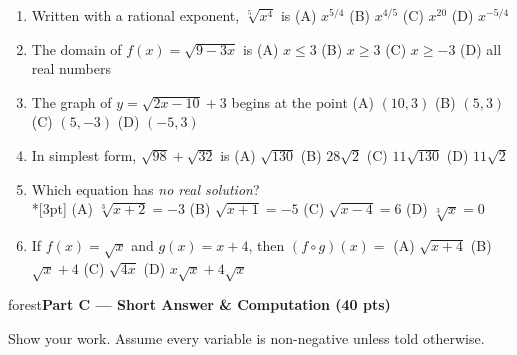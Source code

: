 \documentclass[10pt]{article}
\newcommand{\parthead}[1]{%
  \vspace{6pt}\noindent
  \begin{headlinebox}{forest}\color{white}\bfseries #1\end{headlinebox}%
  \vspace{4pt}}
\begin{document}
\begin{enumerate}[leftmargin=1.9em, itemsep=9pt]
  \item Written with a rational exponent, $\sqrt[5]{x^4}$ is\rlap{\hspace{4pt}\choicebox{\gradedblank[id=q9, type=choice, points=2, answer={B}]{0.3in}{10pt}}}
    \hfill (A) $x^{5/4}$ \quad (B) $x^{4/5}$ \quad (C) $x^{20}$ \quad (D) $x^{-5/4}$
  \item The domain of $f(x)=\sqrt{9-3x}$ is\rlap{\hspace{4pt}\choicebox{\gradedblank[id=q10, type=choice, points=2, answer={A}]{0.3in}{10pt}}}
    \hfill (A) $x\le 3$ \quad (B) $x\ge 3$ \quad (C) $x\ge -3$ \quad (D) all real numbers
  \item The graph of $y=\sqrt{2x-10}+3$ begins at the point\rlap{\hspace{4pt}\choicebox{\gradedblank[id=q11, type=choice, points=2, answer={B}]{0.3in}{10pt}}}
    \hfill (A) $(10,3)$ \quad (B) $(5,3)$ \quad (C) $(5,-3)$ \quad (D) $(-5,3)$
  \item In simplest form, $\sqrt{98}+\sqrt{32}$ is\rlap{\hspace{4pt}\choicebox{\gradedblank[id=q12, type=choice, points=2, answer={D}]{0.3in}{10pt}}}
    \hfill (A) $\sqrt{130}$ \quad (B) $28\sqrt2$ \quad (C) $11\sqrt{130}$ \quad (D) $11\sqrt2$
  \item {}Which equation has \emph{no real solution}?
    \\*[3pt]\hspace*{1.2em} (A) $\sqrt[3]{x+2}=-3$
    \hspace{1.0cm} (B) $\sqrt{x+1}=-5$
    \hspace{1.0cm} (C) $\sqrt{x-4}=6$
    \hspace{1.0cm} (D) $\sqrt[3]{x}=0$
  \item If $f(x)=\sqrt{x}$ and $g(x)=x+4$, then $(f\circ g)(x)=$\rlap{\hspace{3pt}\choicebox{\gradedblank[id=q14, type=choice, points=2, answer={A}]{0.26in}{10pt}}}
    \hfill (A) $\sqrt{x+4}$ \quad (B) $\sqrt{x}+4$ \quad (C) $\sqrt{4x}$ \quad (D) $x\sqrt{x}+4\sqrt{x}$
\end{enumerate}

\parthead{Part C --- Short Answer \& Computation (40 pts)}
Show your work. Assume every variable is non-negative unless told otherwise.
\end{document}
